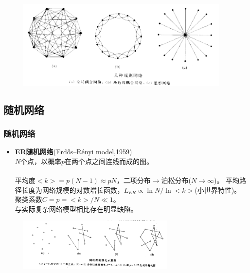 	\begin{frame}
		\begin{figure}[htbp]
			\centering
			\includegraphics[width=0.95\textwidth, bb = 0 0 1548 649]{pic/01-rgraph.png}
		\end{figure}
	\end{frame}
	
\subsection*{随机网络}

	\begin{frame}
		\frametitle{随机网络}
		\begin{itemize}
			\item \textbf{ER随机网络}(Erdős–Rényi model,1959) \\ 
					$N$个点，以概率$p$在两个点之间连线而成的图。\\ ~\\
					平均度$<k> = p(N-1) \approx pN$，二项分布$\rightarrow $泊松分布($N\rightarrow \infty$)。
					平均路径长度为网络规模的对数增长函数，$L_{ER} \propto \ln N / \ln <k>$(小世界特性)。\\
					聚类系数$C=p=<k>/N \ll 1$。 \\
					与实际复杂网络模型相比存在明显缺陷。
		\end{itemize}
		
		\begin{figure}[htbp]
			\centering
			\includegraphics[width=0.7\textwidth, bb = 0 0 1186 400]{pic/01-ERgraph.png}
		\end{figure}
	\end{frame}

